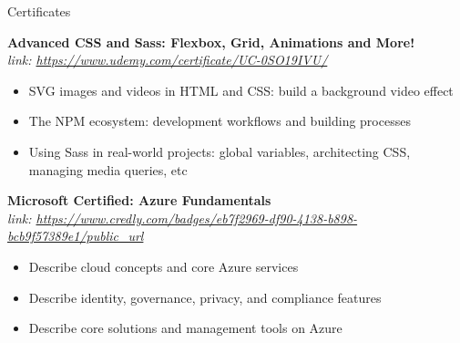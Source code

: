 \documentclass{resume} %
\newcommand{\sepspace}{\vspace*{0.5em}}           %
\begin{document}
\pagebreak

\begin{rSection}{Certificates}

        \textbf{ Advanced CSS and Sass: Flexbox, Grid, Animations and More! } \\
        \textit{link: \url{https://www.udemy.com/certificate/UC-0SO19IVU/} } 
        \begin{itemize}[noitemsep,topsep=-6pt]
          \item SVG images and videos in HTML and CSS: build a background video effect
          \item The NPM ecosystem: development workflows and building processes
          \item Using Sass in real-world projects: global variables, architecting CSS, managing media queries, etc
        \end{itemize}

        \sepspace

        \textbf{ Microsoft Certified: Azure Fundamentals } \\
        \textit{link: \url{https://www.credly.com/badges/eb7f2969-df90-4138-b898-bcb9f57389e1/public_url} } 
        \begin{itemize}[noitemsep,topsep=-6pt]
          \item Describe cloud concepts and core Azure services
          \item Describe identity, governance, privacy, and compliance features
          \item Describe core solutions and management tools on Azure
        \end{itemize}
        
\end{rSection}
\end{document}
